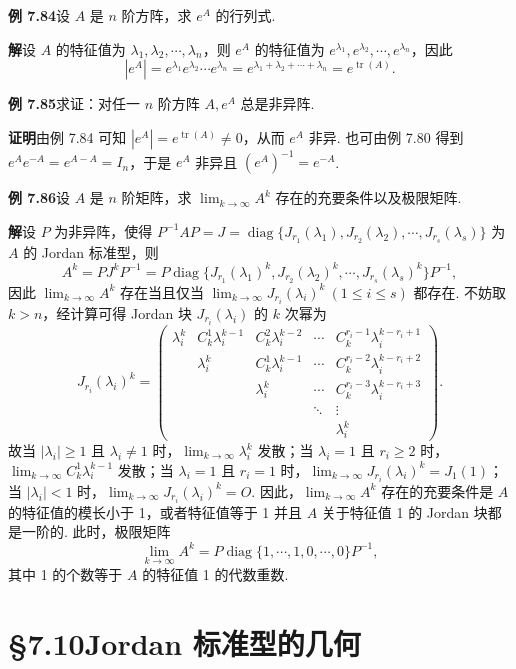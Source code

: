 \documentclass[UTF8,12pt,a4paper,fontset=fandol]{ctexart}
\begin{document}
\noindent\textbf{例 7.84}\quad 设 $A$ 是 $n$ 阶方阵，求 $e^A$ 的行列式.

\noindent\textbf{解}\quad 设 $A$ 的特征值为 $\lambda_1,\lambda_2,\cdots,\lambda_n$，则 $e^A$ 的特征值为 $e^{\lambda_1},e^{\lambda_2},\cdots,e^{\lambda_n}$，因此
\[
|e^A|=e^{\lambda_1}e^{\lambda_2}\cdots e^{\lambda_n}=e^{\lambda_1+\lambda_2+\cdots+\lambda_n}=e^{\operatorname{tr}(A)}.
\]

\noindent\textbf{例 7.85}\quad 求证：对任一 $n$ 阶方阵 $A,e^A$ 总是非异阵.

\noindent\textbf{证明}\quad 由例 7.84 可知 $|e^A|=e^{\operatorname{tr}(A)}\ne0$，从而 $e^A$ 非异. 也可由例 7.80 得到 $e^Ae^{-A}=e^{A-A}=I_n$，于是 $e^A$ 非异且 $(e^A)^{-1}=e^{-A}$.

\noindent\textbf{例 7.86}\quad 设 $A$ 是 $n$ 阶矩阵，求 $\lim_{k\to\infty}A^k$ 存在的充要条件以及极限矩阵.

\noindent\textbf{解}\quad 设 $P$ 为非异阵，使得 $P^{-1}AP=J=\operatorname{diag}\{J_{r_1}(\lambda_1),J_{r_2}(\lambda_2),\cdots,J_{r_s}(\lambda_s)\}$ 为 $A$ 的 Jordan 标准型，则
\[
A^k=PJ^kP^{-1}=P\operatorname{diag}\{J_{r_1}(\lambda_1)^k,J_{r_2}(\lambda_2)^k,\cdots,J_{r_s}(\lambda_s)^k\}P^{-1},
\]
因此 $\lim_{k\to\infty}A^k$ 存在当且仅当 $\lim_{k\to\infty}J_{r_i}(\lambda_i)^k\ (1\le i\le s)$ 都存在. 不妨取 $k>n$，经计算可得 Jordan 块 $J_{r_i}(\lambda_i)$ 的 $k$ 次幂为
\[
J_{r_i}(\lambda_i)^k=\left(\begin{array}{ccccc}
\lambda_i^k&C_k^1\lambda_i^{k-1}&C_k^2\lambda_i^{k-2}&\cdots&C_k^{r_i-1}\lambda_i^{k-r_i+1}\\
&\lambda_i^k&C_k^1\lambda_i^{k-1}&\cdots&C_k^{r_i-2}\lambda_i^{k-r_i+2}\\
&&\lambda_i^k&\cdots&C_k^{r_i-3}\lambda_i^{k-r_i+3}\\
&&&\ddots&\vdots\\
&&&&\lambda_i^k
\end{array}\right).
\]
故当 $|\lambda_i|\ge1$ 且 $\lambda_i\ne1$ 时，$\lim_{k\to\infty}\lambda_i^k$ 发散；当 $\lambda_i=1$ 且 $r_i\ge2$ 时，$\lim_{k\to\infty}C_k^1\lambda_i^{k-1}$ 发散；当 $\lambda_i=1$ 且 $r_i=1$ 时，$\lim_{k\to\infty}J_{r_i}(\lambda_i)^k=J_1(1)$；当 $|\lambda_i|<1$ 时，$\lim_{k\to\infty}J_{r_i}(\lambda_i)^k=O$. 因此，$\lim_{k\to\infty}A^k$ 存在的充要条件是 $A$ 的特征值的模长小于 1，或者特征值等于 1 并且 $A$ 关于特征值 1 的 Jordan 块都是一阶的. 此时，极限矩阵
\[
\lim_{k\to\infty}A^k=P\operatorname{diag}\{1,\cdots,1,0,\cdots,0\}P^{-1},
\]
其中 1 的个数等于 $A$ 的特征值 1 的代数重数.

\section*{§7.10\quad Jordan 标准型的几何}
\end{document}
